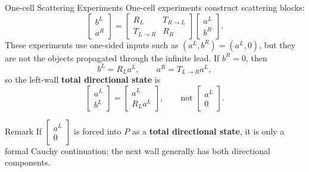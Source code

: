 \documentclass[aspectratio=169]{beamer}
\begin{document}
\begin{frame}{One-cell Scattering Experiments}
  \footnotesize
  One-cell experiments construct scattering blocks:
  \[
    \begin{bmatrix}b^L\\ a^R\end{bmatrix}
    =
    \begin{bmatrix}
      R_L & T_{R\to L}\\
      T_{L\to R} & R_R
    \end{bmatrix}
    \begin{bmatrix}a^L\\ b^R\end{bmatrix}.
  \]
  These experiments use one-sided inputs such as
  \((a^L,b^R)=(a^L,0)\), but they are not the objects propagated through the
  infinite lead.  If \(b^R=0\), then
  \[
    b^L=R_La^L,
    \qquad
    a^R=T_{L\to R}a^L,
  \]
  so the left-wall \textbf{total directional state} is
  \[
    \begin{bmatrix}a^L\\b^L\end{bmatrix}
    =
    \begin{bmatrix}a^L\\R_La^L\end{bmatrix},
    \qquad
    \text{not }
    \begin{bmatrix}a^L\\0\end{bmatrix}.
  \]
  \begin{block}{Remark}
    If \(\begin{bmatrix}a^L\\0\end{bmatrix}\) is forced into \(P\) as a
    \textbf{total directional state}, it is only a formal Cauchy continuation;
    the next wall generally has both directional components.
  \end{block}
\end{frame}
\end{document}
